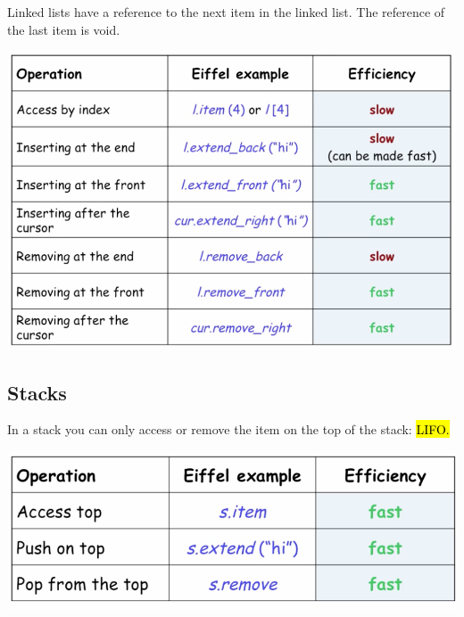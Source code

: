 \documentclass[11pt]{article}
\begin{document}
Linked lists have a reference to the next item in the linked list. The reference of the last item is void.
\begin{center}
	\includegraphics[width = 15cm]{Eprog/linked}
\end{center}

\subsection{Stacks}
In a stack you can only access or remove the item on the top of the stack: \hl{LIFO.}
\begin{center}
	\includegraphics[width = 15cm]{Eprog/stack}
\end{center}
\end{document}
